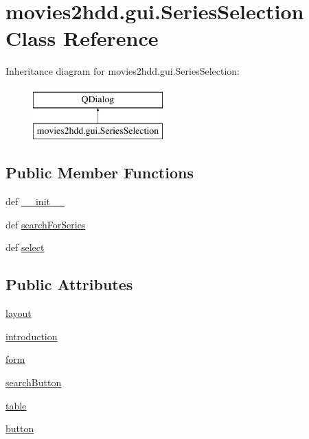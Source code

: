 \hypertarget{classmovies2hdd_1_1gui_1_1_series_selection}{\section{movies2hdd.\-gui.\-Series\-Selection Class Reference}
\label{classmovies2hdd_1_1gui_1_1_series_selection}
}
Inheritance diagram for movies2hdd.\-gui.\-Series\-Selection\-:\begin{figure}[H]
\begin{center}
\leavevmode
\includegraphics[height=2.000000cm]{classmovies2hdd_1_1gui_1_1_series_selection}
\end{center}
\end{figure}
\subsection*{Public Member Functions}
\begin{DoxyCompactItemize}
\item 
def \hyperlink{classmovies2hdd_1_1gui_1_1_series_selection_aa7aee53dd5df33e036a5bbffe99a903b}{\-\_\-\-\_\-init\-\_\-\-\_\-}
\item 
def \hyperlink{classmovies2hdd_1_1gui_1_1_series_selection_a59d9d53410754b1a797e2ec645c57591}{search\-For\-Series}
\item 
def \hyperlink{classmovies2hdd_1_1gui_1_1_series_selection_a97b0edb40452ba405e776132cae34997}{select}
\end{DoxyCompactItemize}
\subsection*{Public Attributes}
\begin{DoxyCompactItemize}
\item 
\hyperlink{classmovies2hdd_1_1gui_1_1_series_selection_a1d4759f70508c7fbcbf5ce849d6cee76}{layout}
\item 
\hyperlink{classmovies2hdd_1_1gui_1_1_series_selection_ae741cee9fe3b6d64c1e62413c063d7b1}{introduction}
\item 
\hyperlink{classmovies2hdd_1_1gui_1_1_series_selection_a514dd2b23706781594fe9d9886a28218}{form}
\item 
\hyperlink{classmovies2hdd_1_1gui_1_1_series_selection_a3ef4927decef147a124124515ab71114}{search\-Button}
\item 
\hyperlink{classmovies2hdd_1_1gui_1_1_series_selection_ac297f3ae5b7cbba9f01a3ebf7fa2fbb5}{table}
\item 
\hyperlink{classmovies2hdd_1_1gui_1_1_series_selection_ac43a1fd2985b12d7d42e5d3af24a5309}{button}
\end{DoxyCompactItemize}


